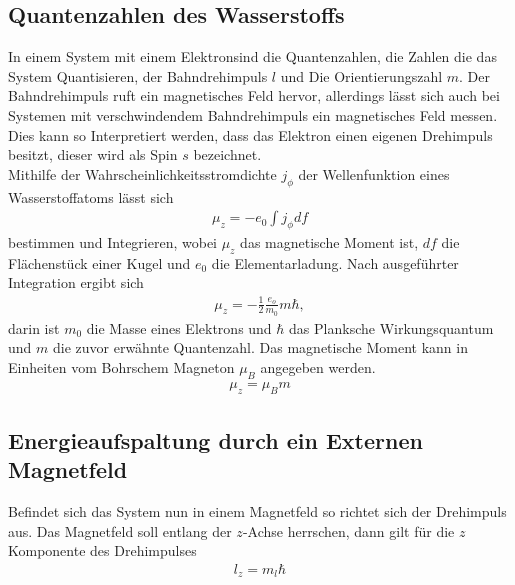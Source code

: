 \subsection{Quantenzahlen des Wasserstoffs}
In einem System mit einem Elektronsind  die Quantenzahlen, die Zahlen die das System Quantisieren, der Bahndrehimpuls $l$ und Die Orientierungszahl $m$. Der Bahndrehimpuls ruft ein magnetisches Feld hervor, allerdings lässt sich auch bei Systemen mit verschwindendem Bahndrehimpuls ein magnetisches Feld messen. Dies kann so Interpretiert werden, dass das Elektron einen eigenen Drehimpuls besitzt, dieser wird als Spin $s$ bezeichnet.\\
Mithilfe der Wahrscheinlichkeitsstromdichte $j_\phi$ der Wellenfunktion eines Wasserstoffatoms lässt sich
\begin{align}
	\mu_z=-e_0\int j_\phi df
\end{align}
bestimmen und Integrieren, wobei $\mu_z$ das magnetische Moment ist, $df$ die Flächenstück einer Kugel und $e_0$ die Elementarladung. Nach ausgeführter Integration ergibt sich 
\begin{align}
	\mu_z=-\frac{1}{2}\frac{e_o}{m_0}m\hbar,
\end{align}
darin ist $m_0$ die Masse eines Elektrons und $\hbar$ das Planksche Wirkungsquantum und $m$ die zuvor erwähnte Quantenzahl. Das magnetische Moment kann in Einheiten vom Bohrschem Magneton $\mu_B$ angegeben werden.
\begin{align}
	\mu_z = \mu_B m
\end{align}
\subsection{Energieaufspaltung durch ein Externen Magnetfeld}
Befindet sich das System nun in einem Magnetfeld so richtet sich der Drehimpuls aus. Das Magnetfeld soll entlang der $z$-Achse herrschen, dann gilt für die $z$ Komponente des Drehimpulses
\begin{align}
	l_z=m_l\hbar
\end{align}

